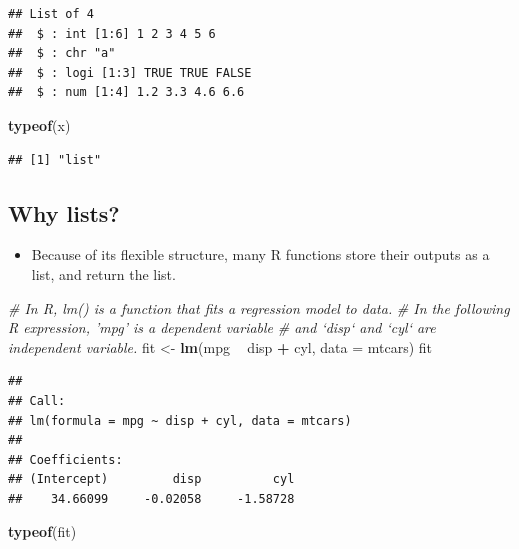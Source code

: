 \documentclass[]{book}
\newenvironment{Shaded}{\begin{snugshade}}{\end{snugshade}}
\newcommand{\CommentTok}[1]{\textcolor[rgb]{0.56,0.35,0.01}{\textit{#1}}}
\newcommand{\DataTypeTok}[1]{\textcolor[rgb]{0.13,0.29,0.53}{#1}}
\newcommand{\KeywordTok}[1]{\textcolor[rgb]{0.13,0.29,0.53}{\textbf{#1}}}
\newcommand{\NormalTok}[1]{#1}
\newcommand{\OperatorTok}[1]{\textcolor[rgb]{0.81,0.36,0.00}{\textbf{#1}}}
\newcommand{\StringTok}[1]{\textcolor[rgb]{0.31,0.60,0.02}{#1}}
\providecommand{\tightlist}{%
  \setlength{\itemsep}{0pt}\setlength{\parskip}{0pt}}
\begin{document}
\begin{verbatim}
## List of 4
##  $ : int [1:6] 1 2 3 4 5 6
##  $ : chr "a"
##  $ : logi [1:3] TRUE TRUE FALSE
##  $ : num [1:4] 1.2 3.3 4.6 6.6
\end{verbatim}

\begin{Shaded}
\begin{Highlighting}[]
\KeywordTok{typeof}\NormalTok{(x)}
\end{Highlighting}
\end{Shaded}

\begin{verbatim}
## [1] "list"
\end{verbatim}

\hypertarget{why-lists}{%
\subsection{Why lists?}\label{why-lists}}

\begin{itemize}
\tightlist
\item
  Because of its flexible structure, many R functions store their outputs as a list, and return the list.
\end{itemize}

\begin{Shaded}
\begin{Highlighting}[]
\CommentTok{# In R, lm() is a function that fits a regression model to data.}
\CommentTok{# In the following R expression, 'mpg' is a dependent variable}
\CommentTok{# and `disp` and `cyl` are independent variable. }
\NormalTok{fit <-}\StringTok{ }\KeywordTok{lm}\NormalTok{(mpg }\OperatorTok{~}\StringTok{ }\NormalTok{disp }\OperatorTok{+}\StringTok{ }\NormalTok{cyl, }\DataTypeTok{data =}\NormalTok{ mtcars)}
\NormalTok{fit}
\end{Highlighting}
\end{Shaded}

\begin{verbatim}
## 
## Call:
## lm(formula = mpg ~ disp + cyl, data = mtcars)
## 
## Coefficients:
## (Intercept)         disp          cyl  
##    34.66099     -0.02058     -1.58728
\end{verbatim}

\begin{Shaded}
\begin{Highlighting}[]
\KeywordTok{typeof}\NormalTok{(fit)}
\end{Highlighting}
\end{Shaded}
\end{document}
